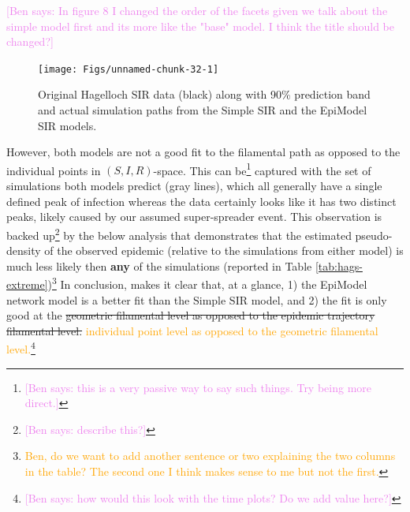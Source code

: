 \documentclass[
  shortnames]{jss}
\begin{document}
\textcolor{violet}{[Ben says: In figure 8 I changed the order of the facets given we talk about the simple model first and its more like the "base" model. I think the title should be changed?]}

\begin{CodeChunk}
\begin{figure}[H]

{\centering \texttt{[image: Figs/unnamed-chunk-32-1]} 

}

\caption{\label{fig:hag-simple-sir}  Original Hagelloch SIR data (black) along with 90\% prediction band and actual simulation paths from the Simple SIR and the EpiModel SIR models.}\label{fig:unnamed-chunk-32}
\end{figure}
\end{CodeChunk}

However, both models are not a good fit to the filamental path as
opposed to the individual points in \((S, I, R)\)-space. This can
be\footnote{\textcolor{violet}{[Ben says: this is a very passive way to say such things. Try being more direct.]}}
captured with the set of simulations both models predict (gray lines),
which all generally have a single defined peak of infection whereas the
data certainly looks like it has two distinct peaks, likely caused by
our assumed super-spreader event. This observation is backed
up\footnote{\textcolor{violet}{[Ben says: describe this?]}} by the below
analysis that demonstrates that the estimated pseudo-density of the
observed epidemic (relative to the simulations from either model) is
much less likely then \textbf{any} of the simulations (reported in Table
\ref{tab:hags-extreme})\footnote{\textcolor{orange}{Ben, do we want to add another sentence or two explaining the two columns in the table?  The second one I think makes sense to me but not the first.}}
In conclusion,  makes it clear that, at a glance, 1) the
EpiModel network model is a better fit than the Simple SIR model, and 2)
the fit is only good at the
\sout{geometric filamental level as opposed to the epidemic trajectory filamental level.}
\textcolor{orange}{individual point level as opposed to the geometric filamental level.}\footnote{\textcolor{violet}{[Ben says: how would this look with the time plots? Do we add value here?]}}
\end{document}
